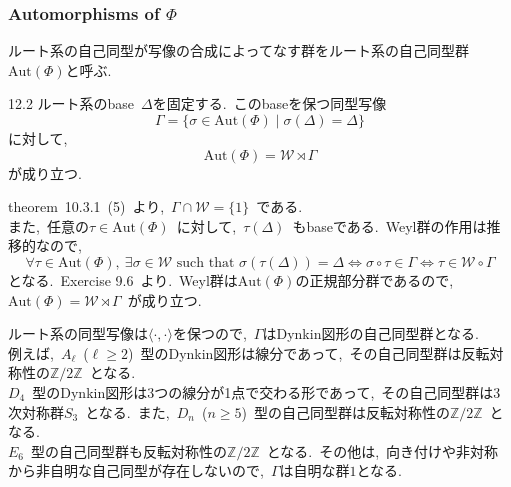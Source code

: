\documentclass[uplatex,dvipdfmx]{jsarticle}
\begin{document}
\subsubsection{Automorphisms of \texorpdfstring{$\Phi$}{Phi}}
ルート系の自己同型が写像の合成によってなす群をルート系の自己同型群$\mathrm{Aut}(\Phi)$と呼ぶ.\\
\begin{mythm}{12.2}
    ルート系のbase~$\Delta$を固定する.~このbaseを保つ同型写像
    \begin{equation*}
        \Gamma = \{\sigma \in \mathrm{Aut}(\Phi) \mid \sigma(\Delta) = \Delta\}
    \end{equation*}
    に対して,
    \begin{equation*}
        \mathrm{Aut}(\Phi) = \mathscr{W} \rtimes \Gamma
    \end{equation*}
    が成り立つ.
\end{mythm}
\begin{myproof}
    theorem~10.3.1~(5)~より,~$\Gamma \cap \mathcal{W} = \{1\}$~である.\\
    また,~任意の$\tau \in \mathrm{Aut}(\Phi)$~に対して,~$\tau(\Delta)$~もbaseである.~Weyl群の作用は推移的なので,
    \begin{equation*}
        \forall \tau \in \mathrm{Aut}(\Phi),~\exists \sigma \in \mathscr{W} \text{ such that } \sigma(\tau(\Delta)) = \Delta \iff \sigma \circ \tau \in \Gamma \iff \tau \in \mathscr{W} \circ \Gamma
    \end{equation*}
    となる.~Exercise 9.6~より.~Weyl群は$\mathrm{Aut}(\Phi)$の正規部分群であるので,~$\mathrm{Aut}(\Phi) = \mathscr{W} \rtimes \Gamma$~が成り立つ.
\end{myproof}
ルート系の同型写像は$\langle \cdot, \cdot \rangle$を保つので,~$\Gamma$はDynkin図形の自己同型群となる.~\\
例えば,~$A_\ell$~($\ell \geq 2$)~型のDynkin図形は線分であって,~その自己同型群は反転対称性の$\mathbb{Z}/2\mathbb{Z}$~となる.~\\
$D_4$~型のDynkin図形は3つの線分が1点で交わる形であって,~その自己同型群は3次対称群$S_3$~となる.~また,~$D_n$~($n \geq 5$)~型の自己同型群は反転対称性の$\mathbb{Z}/2\mathbb{Z}$~となる.~\\
$E_6$~型の自己同型群も反転対称性の$\mathbb{Z}/2\mathbb{Z}$~となる.~その他は,~向き付けや非対称から非自明な自己同型が存在しないので,~$\Gamma$は自明な群$1$となる.
\end{document}
